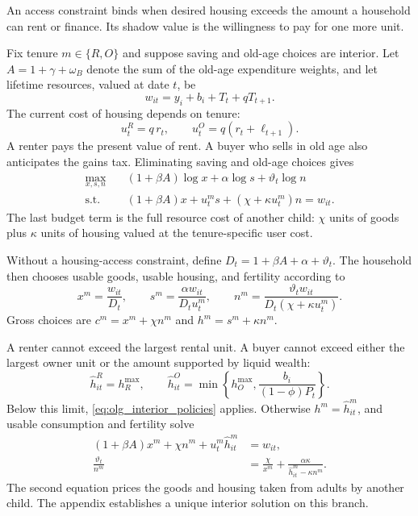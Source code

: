An access constraint binds when desired housing exceeds the amount a household
can rent or finance.  Its shadow value is the willingness to pay for one more
unit.

Fix tenure $m\in\{R,O\}$ and suppose saving and old-age choices are interior.
Let
$A=1+\gamma+\omega_B$ denote the sum of the old-age expenditure weights, and
let lifetime resources, valued at date $t$, be
\begin{equation}
 w_{it}=y_i+b_i+T_t+qT_{t+1}.
 \label{eq:olg_lifetime_objects}
\end{equation}
The current cost of housing depends on tenure:
\begin{equation}
 u_t^R=q\,r_t,\qquad u_t^O=q(r_t+\ell_{t+1}).
 \label{eq:olg_tenure_user_costs}
\end{equation}
A renter pays the present value of rent.  A buyer who sells in old age also
anticipates the gains tax.  Eliminating saving and old-age choices gives
\begin{align}
 \max_{x,s,n}\quad &(1+\beta A)\log x+\alpha\log s+
 \vartheta_t\log n \nonumber\\
 \text{s.t.}\quad &(1+\beta A)x+u_t^m s+
 (\chi+\kappa u_t^m)n=w_{it}.
 \label{eq:olg_interior_lifetime_problem}
\end{align}
The last budget term is the full resource cost of another child: $\chi$ units
of goods plus $\kappa$ units of housing valued at the tenure-specific user
cost.

Without a housing-access constraint, define
$D_t=1+\beta A+\alpha+\vartheta_t$.  The household then chooses usable goods,
usable housing, and fertility according to
\begin{equation}
 x^m=\frac{w_{it}}{D_t},\qquad
 s^m=\frac{\alpha w_{it}}{D_tu_t^m},\qquad
 n^m=\frac{\vartheta_t w_{it}}
 {D_t(\chi+\kappa u_t^m)}.
 \label{eq:olg_interior_policies}
\end{equation}
Gross choices are $c^m=x^m+\chi n^m$ and $h^m=s^m+\kappa n^m$.

A renter cannot exceed the largest rental unit.  A buyer cannot exceed either
the largest owner unit or the amount supported by liquid wealth:
\begin{equation}
 \widehat h_{it}^R=h_R^{\max},\qquad
 \widehat h_{it}^O=\min\left\{h_O^{\max},
 \frac{b_i}{(1-\phi)P_t}\right\}.
 \label{eq:olg_effective_caps}
\end{equation}
Below this limit, \eqref{eq:olg_interior_policies} applies.  Otherwise
$h^m=\widehat h_{it}^m$, and usable consumption and fertility solve
\begin{align}
 (1+\beta A)x^m+\chi n^m+u_t^m\widehat h_{it}^m&=w_{it},
 \label{eq:olg_binding_budget}\\
 \frac{\vartheta_t}{n^m}
 &=\frac{\chi}{x^m}
 +\frac{\alpha\kappa}{\widehat h_{it}^m-\kappa n^m}.
 \label{eq:olg_binding_fertility_foc}
\end{align}
The second equation prices the goods and housing taken from adults by another
child.  The appendix establishes a unique interior solution on this branch.

